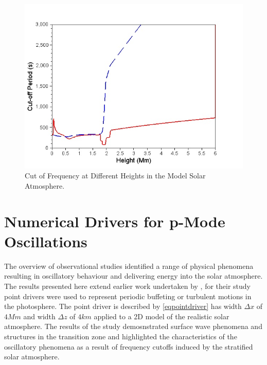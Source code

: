 \documentclass{aa}
\begin{document}

\begin{figure}[h]\label{cutofffrequency_fig4}
\includegraphics[scale=0.7]{images/cutofffrequency_fig4.jpg}
\caption{Cut of Frequency at Different Heights in the Model  Solar Atmosphere. }
\end{figure}






\section{Numerical Drivers for p-Mode Oscillations}
The overview of observational studies identified a range of physical phenomena resulting in oscillatory behaviour and delivering energy into the solar atmosphere.  The results presented here extend earlier work undertaken by  \cite{Malins2007A}, for their study point drivers were used to represent periodic buffeting or turbulent motions in the photosphere. The point driver is described by \eqref{eqpointdriver} has width  $\Delta x$ of $4Mm$ and width $\Delta z$  of $4km$ applied to a 2D model of the realistic solar atmosphere. The results of the study demosnstrated surface wave phenomena and structures in the transition zone and highlighted the characteristics of the oscillatory phenomena as a result of frequency cutoffs induced by the stratified solar atmosphere. 
\end{document}
